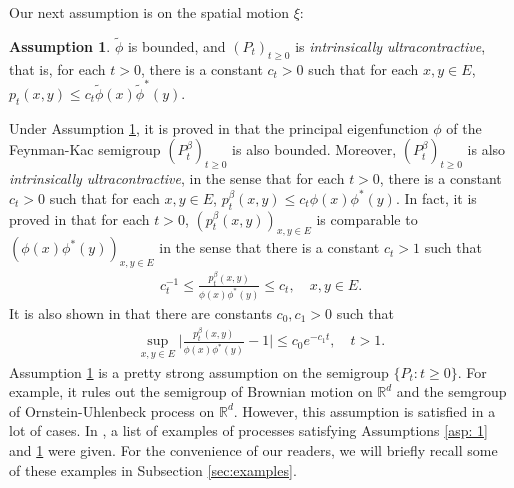 \documentclass[12pt,a4paper]{amsart}
\theoremstyle{definition}
\newtheorem{asp}{Assumption}
\numberwithin{equation}{section}
\begin{document}
Our next assumption is on the spatial motion $\xi$:

\begin{asp} \label{asp: 3}
	$\widetilde \phi$ is bounded, and $(P_t)_{t\geq 0}$ is \emph{intrinsically ultracontractive}, that is, for each $t>0$, there is a constant $c_t >0$ such that for each $x,y\in E$, $p_t(x,y) \leq c_t \widetilde \phi(x) \widetilde \phi^*(y)$.
\end{asp}
	
Under Assumption \ref{asp: 3}, it is proved in \cite{RenSongZhang2015Limit, RenSongZhang2017Central} that the principal eigenfunction $\phi$ of the Feynman-Kac semigroup $(P^\beta_t)_{t\geq 0}$ is also bounded.
Moreover, $(P^\beta_t)_{t\geq 0}$ is also \emph{intrinsically ultracontractive}, in the sense that for each $t>0$, there is a constant $c_t >0$ such that for each $x,y\in E$, $p^\beta_t(x,y) \leq c_t \phi(x) \phi^*(y)$.
In fact, it is proved in \cite{KimSong2008Intrinsic} that for each $t>0$, $(p^\beta_t(x,y))_{x,y\in E}$ is comparable to $(\phi(x)\phi^*(y))_{x,y\in E}$ in the sense that there is a constant $c_t > 1$ such that
\begin{align}\label{eq: p-t-beta is comparable to phi phi-star}
	c_t^{-1}
	\leq \frac {p^\beta_t(x,y)} {\phi(x)\phi^*(y)}
	\leq c_t,
	\quad x,y \in E.
\end{align}
It is also shown in \cite{KimSong2008Intrinsic} that there are constants $c_0, c_1 > 0$ such that
\begin{align}\label{eq:q(t,x,y)}
	\sup_{x,y\in E} \Big|\frac{p^\beta_t(x,y)}{\phi(x)\phi^*(y)} - 1 \Big|
	\leq c_0 e^{-c_1 t},
	\quad t > 1.
\end{align}
Assumption \ref{asp: 3} is a pretty strong assumption on the semigroup $\{P_t : t \ge 0\}$.
For example, it rules out the semigroup of Brownian motion on $\mathbb R^d$ and the semgroup of
Ornstein-Uhlenbeck process on $\mathbb R^d$.
 However, this assumption is satisfied in a lot of cases.  
In \cite{RenSongZhang2015Limit},  a list of examples of processes satisfying 
 Assumptions \ref{asp: 1} and \ref{asp: 3} were given. 
For the convenience of our readers, we will
briefly recall some of these examples in Subsection \ref{sec:examples}.
\end{document}
